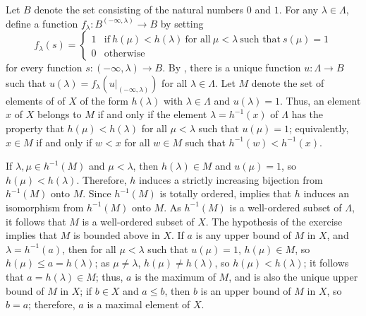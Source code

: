 \documentclass{article}
\begin{document}
\begin{solution}[\ref{exe:5qa65h5w}]
  \label{sol:s0vlfhkj}
  Let \(B\) denote the set consisting of the natural numbers \(0\) and
  \(1\).  For any \(\lambda \in \Lambda\), define a function
  \(f_\lambda : B^{(-\infty, \lambda)} \to B\) by setting
  \begin{displaymath}
    f_\lambda(s) =
    \begin{cases}
      1
      & \text{if} ~ h(\mu) < h(\lambda) ~ \text{for all}
        ~ \mu < \lambda ~ \text{such that} ~ s(\mu) = 1 \\
      0
      & \text{otherwise}
    \end{cases}
  \end{displaymath}
  for every function \(s : (-\infty, \lambda) \to B\).  By
  , there is a unique function
  \(u : \Lambda \to B\) such that
  \(u(\lambda) = f_\lambda(u \vert_{(-\infty, \lambda)})\) for all
  \(\lambda \in \Lambda\).  Let \(M\) denote the set of elements of of
  \(X\) of the form \(h(\lambda)\) with \(\lambda \in \Lambda\) and
  \(u(\lambda) = 1\).  Thus, an element \(x\) of \(X\) belongs to
  \(M\) if and only if the element \(\lambda = h^{-1}(x)\) of
  \(\Lambda\) has the property that \(h(\mu) < h(\lambda)\) for all
  \(\mu < \lambda\) such that \(u(\mu) = 1\); equivalently,
  \(x \in M\) if and only if \(w < x\) for all \(w \in M\) such that
  \(h^{-1}(w) < h^{-1}(x)\).

  If \(\lambda,\mu \in h^{-1}(M)\) and \(\mu < \lambda\), then
  \(h(\lambda) \in M\) and \(u(\mu) = 1\), so \(h(\mu) < h(\lambda)\).
  Therefore, \(h\) induces a strictly increasing bijection from
  \(h^{-1}(M)\) onto \(M\).  Since \(h^{-1}(M)\) is totally ordered,
   implies that \(h\) induces an isomorphism from
  \(h^{-1}(M)\) onto \(M\).  As \(h^{-1}(M)\) is a well-ordered subset
  of \(\Lambda\), it follows that \(M\) is a well-ordered subset of
  \(X\).  The hypothesis of the exercise implies that \(M\) is bounded
  above in \(X\).  If \(a\) is any upper bound of \(M\) in \(X\), and
  \(\lambda = h^{-1}(a)\), then for all
  \(\mu < \lambda\) such that \(u(\mu) = 1\), \(h(\mu) \in M\), so
  \(h(\mu) \leq a = h(\lambda)\); as \(\mu \neq \lambda\),
  \(h(\mu) \neq h(\lambda)\), so \(h(\mu) < h(\lambda)\); it follows
  that \(a = h(\lambda) \in M\); thus, \(a\) is the maximum of \(M\),
  and is also the unique upper bound of \(M\) in \(X\); if \(b \in X\)
  and \(a \leq b\), then \(b\) is an upper bound of \(M\) in \(X\), so
  \(b = a\); therefore, \(a\) is a maximal element of \(X\).
\end{solution}
\end{document}
